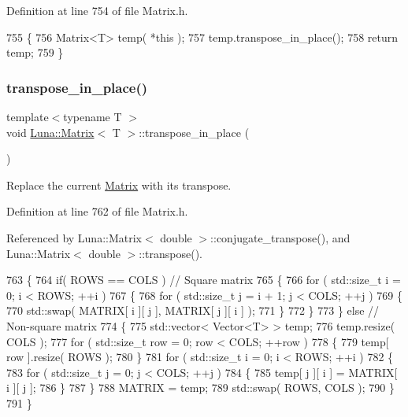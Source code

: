 Definition at line 754 of file Matrix.\+h.


\begin{DoxyCode}
755   \{
756     Matrix<T> temp( *\textcolor{keyword}{this} );
757     temp.transpose\_in\_place();
758     \textcolor{keywordflow}{return} temp;
759   \}
\end{DoxyCode}
\mbox{\label{classLuna_1_1Matrix_adccfbb96c27eb230b0c5c63b458c7650}} 
\subsubsection{\texorpdfstring{transpose\+\_\+in\+\_\+place()}{transpose\_in\_place()}}
{\footnotesize\ttfamily template$<$typename T $>$ \\
void \hyperlink{classLuna_1_1Matrix}{Luna\+::\+Matrix}$<$ T $>$\+::transpose\+\_\+in\+\_\+place (\begin{DoxyParamCaption}{ }\end{DoxyParamCaption})\hspace{0.3cm}{\ttfamily [inline]}}



Replace the current \hyperlink{classLuna_1_1Matrix}{Matrix} with its transpose. 



Definition at line 762 of file Matrix.\+h.



Referenced by Luna\+::\+Matrix$<$ double $>$\+::conjugate\+\_\+transpose(), and Luna\+::\+Matrix$<$ double $>$\+::transpose().


\begin{DoxyCode}
763   \{
764     \textcolor{keywordflow}{if}( ROWS == COLS ) \textcolor{comment}{// Square matrix}
765     \{
766       \textcolor{keywordflow}{for} ( std::size\_t i = 0; i < ROWS; ++i )
767       \{
768         \textcolor{keywordflow}{for} ( std::size\_t j = i + 1; j < COLS; ++j )
769         \{
770           std::swap( MATRIX[ i ][ j ], MATRIX[ j ][ i ] );
771         \}
772       \}
773     \} \textcolor{keywordflow}{else} \textcolor{comment}{// Non-square matrix}
774     \{
775       std::vector< Vector<T> > temp;
776       temp.resize( COLS );
777       \textcolor{keywordflow}{for} ( std::size\_t row = 0; row < COLS; ++row )
778        \{
779          temp[ row ].resize( ROWS );
780        \}
781        \textcolor{keywordflow}{for} ( std::size\_t i = 0; i < ROWS; ++i )
782        \{
783          \textcolor{keywordflow}{for} ( std::size\_t j = 0; j < COLS; ++j )
784          \{
785            temp[ j ][ i ] = MATRIX[ i ][ j ];
786          \}
787        \}
788        MATRIX = temp;
789        std::swap( ROWS, COLS );
790     \}
791   \}
\end{DoxyCode}


